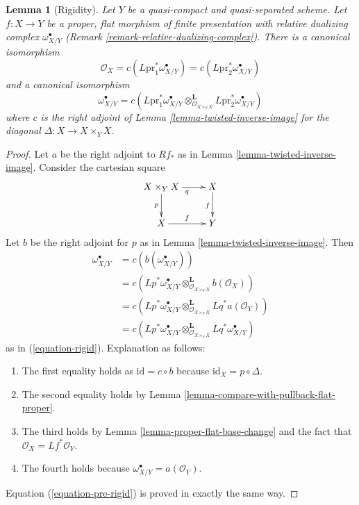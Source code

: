 \documentclass{stacks-project}
\theoremstyle{plain}
\newtheorem{lemma}[subsection]{Lemma}
\theoremstyle{definition}
\theoremstyle{remark}
\numberwithin{equation}{subsection}
\begin{document}
\begin{lemma}[Rigidity]
\label{lemma-van-den-bergh}
Let $Y$ be a quasi-compact and quasi-separated scheme.
Let $f : X \to Y$ be a proper, flat morphism of finite presentation
with relative dualizing complex $\omega_{X/Y}^\bullet$
(Remark \ref{remark-relative-dualizing-complex}).
There is a canonical isomorphism
\begin{equation}
\label{equation-pre-rigid}
\mathcal{O}_X =
c(L\text{pr}_1^*\omega_{X/Y}^\bullet) =
c(L\text{pr}_2^*\omega_{X/Y}^\bullet)
\end{equation}
and a canonical isomorphism
\begin{equation}
\label{equation-rigid}
\omega_{X/Y}^\bullet =
c\left(L\text{pr}_1^*\omega_{X/Y}^\bullet
\otimes_{\mathcal{O}_{X \times_Y X}}^\mathbf{L}
L\text{pr}_2^*\omega_{X/Y}^\bullet\right)
\end{equation}
where $c$ is the right adjoint of
Lemma \ref{lemma-twisted-inverse-image}
for the diagonal $\Delta : X \to X \times_Y X$.
\end{lemma}

\begin{proof}
Let $a$ be the right adjoint to $Rf_*$ as in
Lemma \ref{lemma-twisted-inverse-image}.
Consider the cartesian square
$$
\xymatrix{
X \times_Y X \ar[r]_q \ar[d]_p & X \ar[d]_f \\
X \ar[r]^f & Y
}
$$
Let $b$ be the right adjoint for $p$
as in Lemma \ref{lemma-twisted-inverse-image}. Then
\begin{align*}
\omega_{X/Y}^\bullet
& =
c(b(\omega_{X/Y}^\bullet)) \\
& =
c(Lp^*\omega_{X/Y}^\bullet
\otimes_{\mathcal{O}_{X \times_Y X}}^\mathbf{L} b(\mathcal{O}_X)) \\
& =
c(Lp^*\omega_{X/Y}^\bullet
\otimes_{\mathcal{O}_{X \times_Y X}}^\mathbf{L}
Lq^*a(\mathcal{O}_Y)) \\
& =
c(Lp^*\omega_{X/Y}^\bullet
\otimes_{\mathcal{O}_{X \times_Y X}}^\mathbf{L}
Lq^*\omega_{X/Y}^\bullet)
\end{align*}
as in (\ref{equation-rigid}). Explanation as follows:
\begin{enumerate}
\item The first equality holds as $\text{id} = c \circ b$ because
$\text{id}_X = p \circ \Delta$.
\item The second equality holds by
Lemma \ref{lemma-compare-with-pullback-flat-proper}.
\item The third holds by Lemma \ref{lemma-proper-flat-base-change}
and the fact that $\mathcal{O}_X = Lf^*\mathcal{O}_Y$.
\item The fourth holds because $\omega_{X/Y}^\bullet = a(\mathcal{O}_Y)$.
\end{enumerate}
Equation (\ref{equation-pre-rigid}) is proved in exactly the same way.
\end{proof}
\end{document}
